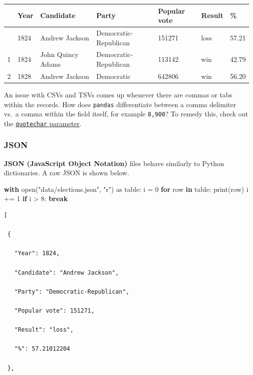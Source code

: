 \documentclass[
  letterpaper,
  DIV=11,
  numbers=noendperiod]{scrreprt}
\newenvironment{Shaded}{\begin{snugshade}}{\end{snugshade}}
\newcommand{\BuiltInTok}[1]{\textcolor[rgb]{0.00,0.23,0.31}{#1}}
\newcommand{\ControlFlowTok}[1]{\textcolor[rgb]{0.00,0.23,0.31}{\textbf{#1}}}
\newcommand{\DecValTok}[1]{\textcolor[rgb]{0.68,0.00,0.00}{#1}}
\newcommand{\ImportTok}[1]{\textcolor[rgb]{0.00,0.46,0.62}{#1}}
\newcommand{\KeywordTok}[1]{\textcolor[rgb]{0.00,0.23,0.31}{\textbf{#1}}}
\newcommand{\NormalTok}[1]{\textcolor[rgb]{0.00,0.23,0.31}{#1}}
\newcommand{\OperatorTok}[1]{\textcolor[rgb]{0.37,0.37,0.37}{#1}}
\newcommand{\StringTok}[1]{\textcolor[rgb]{0.13,0.47,0.30}{#1}}
\begin{document}
\begin{longtable}[]{@{}lllllll@{}}
\toprule\noalign{}
& Year & Candidate & Party & Popular vote & Result & \% \\
\midrule\noalign{}
\endhead
\bottomrule\noalign{}
\endlastfoot
0 & 1824 & Andrew Jackson & Democratic-Republican & 151271 & loss &
57.21 \\
1 & 1824 & John Quincy Adams & Democratic-Republican & 113142 & win &
42.79 \\
2 & 1828 & Andrew Jackson & Democratic & 642806 & win & 56.20 \\
\end{longtable}

An issue with CSVs and TSVs comes up whenever there are commas or tabs
within the records. How does \texttt{pandas} differentiate between a
comma delimiter vs.~a comma within the field itself, for example
\texttt{8,900}? To remedy this, check out the
\href{https://pandas.pydata.org/docs/reference/api/pandas.read_csv.html}{\texttt{quotechar}
parameter}.

\subsubsection{JSON}\label{json}

\textbf{JSON (JavaScript Object Notation)} files behave similarly to
Python dictionaries. A raw JSON is shown below.

\begin{Shaded}
\begin{Highlighting}[]
\ControlFlowTok{with} \BuiltInTok{open}\NormalTok{(}\StringTok{"data/elections.json"}\NormalTok{, }\StringTok{"r"}\NormalTok{) }\ImportTok{as}\NormalTok{ table:}
\NormalTok{    i }\OperatorTok{=} \DecValTok{0}
    \ControlFlowTok{for}\NormalTok{ row }\KeywordTok{in}\NormalTok{ table:}
        \BuiltInTok{print}\NormalTok{(row)}
\NormalTok{        i }\OperatorTok{+=} \DecValTok{1}
        \ControlFlowTok{if}\NormalTok{ i }\OperatorTok{\textgreater{}} \DecValTok{8}\NormalTok{:}
            \ControlFlowTok{break}
\end{Highlighting}
\end{Shaded}

\begin{verbatim}
[

 {

   "Year": 1824,

   "Candidate": "Andrew Jackson",

   "Party": "Democratic-Republican",

   "Popular vote": 151271,

   "Result": "loss",

   "%": 57.21012204

 },
\end{verbatim}
\end{document}
